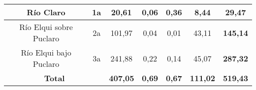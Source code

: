 \documentclass[10pt]{article}
\begin{document}
\begin{table}[]
\begin{tabular}{|c|c|c|c|c|c|c|}
Río Claro                                                                          & 1a                                                                                & 20,61                                                                                       & 0,06                               & 0,36                               & 8,44                                 & \textbf{29,47}                                                                 \\ \hline
Río Elqui sobre Puclaro                                                            & 2a                                                                                & 101,97                                                                                      & 0,04                               & 0,01                               & 43,11                                & \textbf{145,14}                                                                \\ \hline
Río Elqui bajo Puclaro                                                             & 3a                                                                                & 241,88                                                                                      & 0,22                               & 0,14                               & 45,07                                & \textbf{287,32}                                                                \\ \hline
\multicolumn{2}{|c|}{\textbf{Total}}                                                                                                                                   & \textbf{407,05}                                                                             & \multicolumn{1}{l|}{\textbf{0,69}} & \multicolumn{1}{l|}{\textbf{0,67}} & \multicolumn{1}{l|}{\textbf{111,02}} & \multicolumn{1}{l|}{\textbf{519,43}}                                           \\ \hline
\end{tabular}
\end{table}
\end{document}
